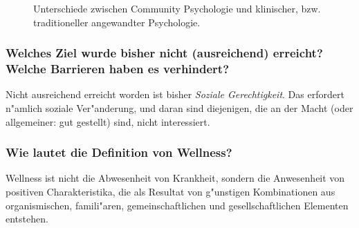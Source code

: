 \begin{figure}[tbh]
        \begin{center}
                \caption{Unterschiede zwischen Community Psychologie und klinischer, bzw. traditioneller angewandter Psychologie.}
                \label{fig:prilleltensky1}
        \end{center}
\end{figure}

\subsubsection{Welches Ziel wurde bisher nicht (ausreichend) erreicht? Welche Barrieren haben es verhindert?}
Nicht ausreichend erreicht worden ist bisher \emph{Soziale Gerechtigkeit}. Das erfordert n"amlich soziale Ver"anderung, und daran sind diejenigen, die an der Macht (oder allgemeiner: gut gestellt) sind, nicht interessiert. 

\subsubsection{Wie lautet die Definition von Wellness?}
Wellness ist nicht die Abwesenheit von Krankheit, sondern die Anwesenheit von positiven Charakteristika, die als Resultat von g"unstigen Kombinationen aus organismischen, famili"aren, gemeinschaftlichen und gesellschaftlichen Elementen entstehen.

